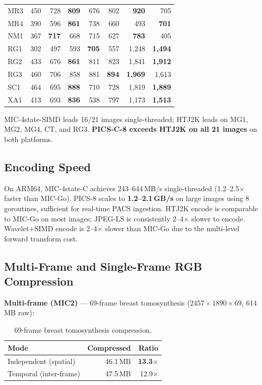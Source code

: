 \documentclass[10pt,twocolumn]{article}
\begin{document}
\begin{table}[t]
\begin{tabular}{lrrrrrrr}
MR3  & 450 & 728 & \textbf{809} & 676 & 802 & \textbf{920} & 705 \\
MR4  & 390 & 596 & \textbf{861} & 738 & 660 & 493 & \textbf{701} \\
NM1  & 367 & \textbf{717} & 668 & 715 & 627 & \textbf{783} & 405 \\
RG1  & 302 & 497 & 593 & \textbf{705} & 557 & 1,248 & \textbf{1,494} \\
RG2  & 433 & 676 & \textbf{861} & 811 & 823 & 1,841 & \textbf{1,912} \\
RG3  & 460 & 706 & 858 & 881 & \textbf{894} & \textbf{1,969} & 1,613 \\
SC1  & 464 & 695 & \textbf{888} & 710 & 728 & 1,819 & \textbf{1,889} \\
XA1  & 413 & 693 & \textbf{836} & 538 & 797 & 1,173 & \textbf{1,513} \\
\bottomrule
\end{tabular}
\end{table}

MIC-4state-SIMD leads 16/21 images single-threaded; HTJ2K leads on MG1, MG2,
MG4, CT, and RG3. \textbf{PICS-C-8 exceeds HTJ2K on all 21 images} on both
platforms.

\subsection{Encoding Speed}

On ARM64, MIC-4state-C achieves 243--644\,MB/s single-threaded (1.2--2.5$\times$
faster than MIC-Go). PICS-8 scales to \textbf{1.2--2.1\,GB/s} on large images
using 8 goroutines, sufficient for real-time PACS ingestion. HTJ2K encode is
comparable to MIC-Go on most images; JPEG-LS is consistently 2--4$\times$ slower
to encode. Wavelet+SIMD encode is 2--4$\times$ slower than MIC-Go due to the
multi-level forward transform cost.

\subsection{Multi-Frame and Single-Frame RGB Compression}

\textbf{Multi-frame (MIC2)} --- 69-frame breast tomosynthesis ($2457 \times
1890 \times 69$, 614\,MB raw):

\begin{table}[htbp]
\centering
\footnotesize
\setlength{\tabcolsep}{4pt}
\caption{69-frame breast tomosynthesis compression.}
\label{tab:multiframe}
\begin{tabular}{lrr}
\toprule
Mode & Compressed & Ratio \\
\midrule
Independent (spatial) & 46.1\,MB & \textbf{13.3$\times$} \\
Temporal (inter-frame) & 47.5\,MB & 12.9$\times$ \\
\bottomrule
\end{tabular}
\end{table}
\end{document}
